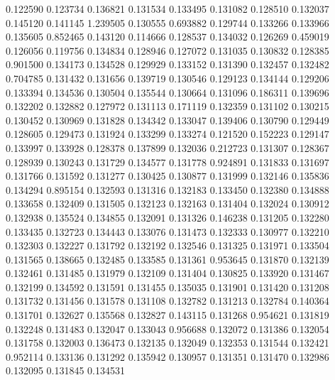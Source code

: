 0.122590
0.123734
0.136821
0.131534
0.133495
0.131082
0.128510
0.132037
0.145120
0.141145
1.239505
0.130555
0.693882
0.129744
0.133266
0.133966
0.135605
0.852465
0.143120
0.114666
0.128537
0.134032
0.126269
0.459019
0.126056
0.119756
0.134834
0.128946
0.127072
0.131035
0.130832
0.128385
0.901500
0.134173
0.134528
0.129929
0.133152
0.131390
0.132457
0.132482
0.704785
0.131432
0.131656
0.139719
0.130546
0.129123
0.134144
0.129206
0.133394
0.134536
0.130504
0.135544
0.130664
0.131096
0.186311
0.139696
0.132202
0.132882
0.127972
0.131113
0.171119
0.132359
0.131102
0.130215
0.130452
0.130969
0.131828
0.134342
0.133047
0.139406
0.130790
0.129449
0.128605
0.129473
0.131924
0.133299
0.133274
0.121520
0.152223
0.129147
0.133997
0.133928
0.128378
0.137899
0.132036
0.212723
0.131307
0.128367
0.128939
0.130243
0.131729
0.134577
0.131778
0.924891
0.131833
0.131697
0.131766
0.131592
0.131277
0.130425
0.130877
0.131999
0.132146
0.135836
0.134294
0.895154
0.132593
0.131316
0.132183
0.133450
0.132380
0.134888
0.133658
0.132409
0.131505
0.132123
0.132163
0.131404
0.132024
0.130912
0.132938
0.135524
0.134855
0.132091
0.131326
0.146238
0.131205
0.132280
0.133435
0.132723
0.134443
0.133076
0.131473
0.132333
0.130977
0.132210
0.132303
0.132227
0.131792
0.132192
0.132546
0.131325
0.131971
0.133504
0.131565
0.138665
0.132485
0.133585
0.131361
0.953645
0.131870
0.132139
0.132461
0.131485
0.131979
0.132109
0.131404
0.130825
0.133920
0.131467
0.132199
0.134592
0.131591
0.131455
0.135035
0.131901
0.131420
0.131208
0.131732
0.131456
0.131578
0.131108
0.132782
0.131213
0.132784
0.140364
0.131701
0.132627
0.135568
0.132827
0.143115
0.131268
0.954621
0.131819
0.132248
0.131483
0.132047
0.133043
0.956688
0.132072
0.131386
0.132054
0.131758
0.132003
0.136473
0.132135
0.132049
0.132353
0.131544
0.132421
0.952114
0.133136
0.131292
0.135942
0.130957
0.131351
0.131470
0.132986
0.132095
0.131845
0.134531

